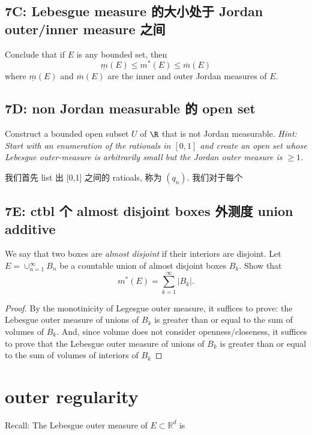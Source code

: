 \documentclass[lang=cn,11pt]{template}
\begin{document}
\section*{7C: Lebesgue measure 的大小处于 Jordan outer/inner measure 之间}
Conclude that if $E$ is any bounded set, then $$\underline m(E) \leq m^*(E) \leq \overline m (E)$$ where $\underline m(E)$ and $\overline m(E)$ are the inner and outer Jordan measures of $E$. 



\section*{7D: non Jordan measurable 的 open set}
Construct a bounded open subset $U$ of $\R$ that is not Jordan measurable. \emph{Hint: Start with an enumeration of the rationals in $[0,1]$ and create an open set whose Lebesgue outer-measure is arbitrarily small but the Jordan outer measure is $\geq 1$.}

\begin{solution}
    我们首先 list 出 [0,1] 之间的 ratioals, 称为 $(q_n)$. 我们对于每个 
\end{solution}


\section*{7E: ctbl 个 almost disjoint boxes 外测度 union additive}
 We say that two boxes are \emph{almost disjoint} if their interiors are disjoint. Let $E=\cup_{n=1}^\infty B_n$ be a countable union of almost disjoint boxes $B_k$. Show that 
$$
m^*(E)=\sum_{k=1}^\infty |B_k|.
$$
\begin{proof}
By the monotinicity of Legesgue outer measure, it suffices to prove: the Lebesgue outer measure of unions of $B_k$ is greater than or equal to the sum of volumes of $B_k$. And, since volume does not consider openness/closeness, it suffices to prove that the Lebesgue outer measure of unions of $B_k$ is greater than or equal to the sum of volumes of interiors of $B_k$
\end{proof}



\newpage
\chapter{outer regularity}
Recall:
The Lebesgue outer measure of $E \subset \mathbb{R}^d$ is
\end{document}

